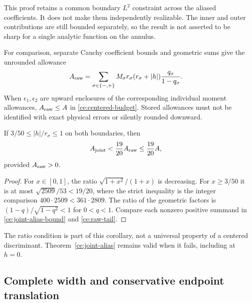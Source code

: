 This proof retains a common boundary $L^2$ constraint across the aliased
coefficients. It does not make them independently realizable. The inner
and outer contributions are still bounded separately, so the result is
not asserted to be sharp for a single analytic function on the annulus.

For comparison, separate Cauchy coefficient bounds and geometric sums
give the unrounded allowance
\begin{equation}
 A_{\rm raw}=\sum_{\sigma\in\{-,+\}}M_\sigma
 r_\sigma(r_\sigma+|h|)\frac{q_\sigma}{1-q_\sigma}.
 \label{ce:raw-tail}
\end{equation}
When $\epsilon_1,\epsilon_2$ are upward enclosures of the corresponding
individual moment allowances, $A_{\rm raw}\le A$ in
\eqref{ce:centered-budget}. Stored allowances must not be identified
with exact physical errors or silently rounded downward.

\begin{corollary}
\label{ce:fractional-tail}
If $3/50\le |h|/r_\sigma\le1$ on both boundaries, then
\begin{equation}
 A_{\rm joint}<\frac{19}{20}A_{\rm raw}\le\frac{19}{20}A,
 \label{ce:tail-reduction}
\end{equation}
provided $A_{\rm raw}>0$.
\end{corollary}
\begin{proof}
For $x\in[0,1]$, the ratio $\sqrt{1+x^2}/(1+x)$ is decreasing.
For $x\ge3/50$ it is at most $\sqrt{2509}/53<19/20$, where the
strict inequality is the integer comparison $400\cdot2509<361\cdot2809$.
The ratio of the geometric factors is
$(1-q)/\sqrt{1-q^2}<1$ for $0<q<1$. Compare each nonzero positive
summand in \eqref{ce:joint-alias-bound} and \eqref{ce:raw-tail}.
\end{proof}

The ratio condition is part of this corollary, not a universal property
of a centered discriminant. Theorem~\ref{ce:joint-alias} remains valid
when it fails, including at $h=0$.

\subsection{Complete width and conservative endpoint translation}

